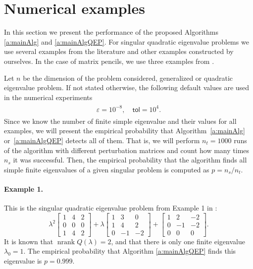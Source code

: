 \documentclass[12pt]{article}
\DeclareMathOperator{\nrank}{nrank}
\begin{document}
\section{Numerical examples}
In this section we present the performance of the proposed Algorithms \ref{a:mainAlg} and \ref{a:mainAlgQEP}. For singular quadratic eigenvalue problems we use several examples from the literature and other examples constructed by ourselves. In the case of matrix pencils, we use three examples from \cite{hochstenbach2019solving}.

Let $n$ be the dimension of the problem considered, generalized or quadratic eigenvalue problem. If not stated otherwise, the following default values are used in the numerical experiments
\begin{align}\label{defaultpar}
\begin{split}
    \varepsilon = 10^{-8},\quad \mathsf{tol} = 10^4.
\end{split}
\end{align}
Since we know the number of finite simple eigenvalue and their values for all examples, we will present the empirical probability that Algorithm~\ref{a:mainAlg} or~\ref{a:mainAlgQEP} detects all of them. That is, we will perform $n_t = 1000$ runs of the algorithm with different perturbation matrices and count how many times $n_s$ it was successful. Then, the empirical probability that the algorithm finds all simple finite eigenvalues of a given singular problem is computed as $p = n_s/n_t$.
\paragraph{Example 1.}
This is the singular quadratic eigenvalue problem from Example 1 in \cite{van1983eigenstructure}:
\begin{equation*}
    \lambda^2 \begin{bmatrix}
        1 & 4 & 2\\
        0 & 0 & 0\\
        1 & 4 & 2
    \end{bmatrix} + \lambda \begin{bmatrix}
        1 & 3 & 0\\
        1 & 4 & 2\\
        0 & -1 & -2
    \end{bmatrix} + \begin{bmatrix}
        1 & 2 & -2\\
        0 & -1 & -2\\
        0 & 0 & 0
    \end{bmatrix}.
\end{equation*}
It is known that $\nrank Q(\lambda) = 2$, and that there is only one finite eigenvalue $\lambda_0 =1$. The empirical probability that Algorithm \ref{a:mainAlgQEP} finds this eigenvalue is $p=0.999$.
\end{document}

